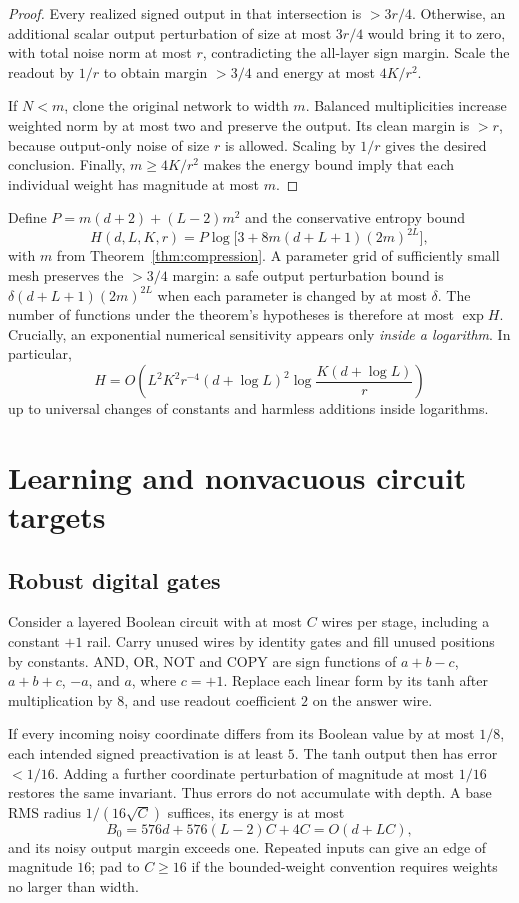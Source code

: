 \documentclass[11pt]{article}
\begin{document}
\begin{proof}
Every realized signed output in that intersection is $>3r/4$. Otherwise,
an additional scalar output perturbation of size at most $3r/4$ would
bring it to zero, with total noise norm at most $r$, contradicting the
all-layer sign margin. Scale the readout by $1/r$ to obtain margin $>3/4$
and energy at most $4K/r^2$.

If $N<m$, clone the original network to width $m$. Balanced multiplicities
increase weighted norm by at most two and preserve the output. Its clean
margin is $>r$, because output-only noise of size $r$ is allowed. Scaling
by $1/r$ gives the desired conclusion. Finally, $m\ge4K/r^2$ makes the
energy bound imply that each individual weight has magnitude at most $m$.
\end{proof}

Define $P=m(d+2)+(L-2)m^2$ and the conservative entropy bound
\begin{equation}\label{eq:entropy}
 H(d,L,K,r)=P\log\bigl[3+8m(d+L+1)(2m)^{2L}\bigr],
\end{equation}
with $m$ from Theorem~\ref{thm:compression}. A parameter grid of sufficiently
small mesh preserves the $>3/4$ margin: a safe output perturbation bound is
$\delta(d+L+1)(2m)^{2L}$ when each parameter is changed by at most $\delta$.
The number of functions under the theorem's hypotheses is therefore at most
$\exp H$. Crucially, an exponential numerical sensitivity appears only
\emph{inside a logarithm}. In particular,
\[
 H=O\!\left(L^2K^2r^{-4}(d+\log L)^2
 \log\frac{K(d+\log L)}{r}\right)
\]
up to universal changes of constants and harmless additions inside logarithms.

\section{Learning and nonvacuous circuit targets}

\subsection{Robust digital gates}

Consider a layered Boolean circuit with at most $C$ wires per stage, including
a constant $+1$ rail. Carry unused wires by identity gates and fill unused
positions by constants. AND, OR, NOT and COPY are sign functions of
$a+b-c$, $a+b+c$, $-a$, and $a$, where $c=+1$.
Replace each linear form by its tanh after multiplication by $8$, and use
readout coefficient $2$ on the answer wire.

If every incoming noisy coordinate differs from its Boolean value by at
most $1/8$, each intended signed preactivation is at least $5$.
The tanh output then has error $<1/16$. Adding a further coordinate
perturbation of magnitude at most $1/16$ restores the same invariant.
Thus errors do not accumulate with depth. A base RMS radius
$1/(16\sqrt C)$ suffices, its energy is at most
\[
 B_0=576d+576(L-2)C+4C=O(d+LC),
\]
and its noisy output margin exceeds one. Repeated inputs can give an edge
of magnitude $16$; pad to $C\ge16$ if the bounded-weight convention requires
weights no larger than width.
\end{document}

